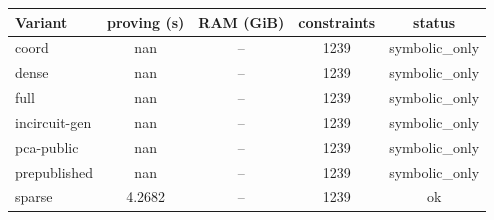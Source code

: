 \begin{tabular}{lcccc}
\toprule
Variant & proving (s) & RAM (GiB) & constraints & status \\
\midrule
coord & nan & -- & 1239 & symbolic\_only \\
dense & nan & -- & 1239 & symbolic\_only \\
full & nan & -- & 1239 & symbolic\_only \\
incircuit-gen & nan & -- & 1239 & symbolic\_only \\
pca-public & nan & -- & 1239 & symbolic\_only \\
prepublished & nan & -- & 1239 & symbolic\_only \\
sparse & 4.2682 & -- & 1239 & ok \\
\bottomrule
\end{tabular}
